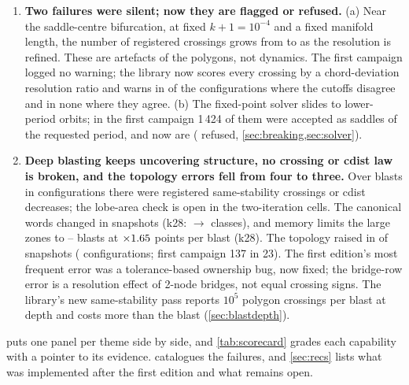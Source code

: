 \documentclass[11pt,a4paper]{article}
\begin{document}
\begin{enumerate}[leftmargin=*]
  \NumIsectMissedTotal{} missed and \NumIsectExtraTotal{} extra. Lobe areas
  are preserved to \NumLobeRatioMax{}, and \NumCdistDecreasingManifolds{}
  cdist decreases occur in \NumCdistStepsManifolds{} steps
  (\cref{sec:invariants,sec:intersections}).
\item \textbf{Two failures were silent; now they are flagged or refused.}
  (a) Near the saddle-centre bifurcation, at fixed $k+1=10^{-4}$ and a fixed
  manifold length, the number of registered crossings grows from
  \NumTangencyCrossingsNearCutoffSeven{} to
  \NumTangencyCrossingsNearCutoffTwelve{} as the resolution is refined. These
  are artefacts of the polygons, not dynamics. The first campaign logged no
  warning; the library now scores every crossing by a chord-deviation
  resolution ratio and warns in \NumTangencyFlaggedBelow{} of the
  configurations where the cutoffs disagree and in none where they agree.
  (b) The fixed-point solver slides to lower-period orbits; in the first
  campaign 1\,424 of them were accepted as saddles of the requested period,
  and now \NumSolverLowerAccepted{} are (\NumSolverLowerRejected{} refused,
  \cref{sec:breaking,sec:solver}).
\item \textbf{Deep blasting keeps uncovering structure, no crossing or cdist
  law is broken, and the topology errors fell from four to three.}
  Over \NumDeepBlasts{} blasts in \NumDeepConfigs{} configurations there were
  \NumDeepLawViolations{} registered same-stability crossings or cdist
  decreases; the lobe-area check is open in the two-iteration cells. The
  canonical words changed in \NumDeepStructureSteps{} snapshots (k28:
  \NumDeepClassesStartKTwoEight{} $\to$ \NumDeepClassesEndKTwoEight{}
  classes), and memory limits the large zones to
  \NumDeepBlastsKThreeTwo--\NumDeepBlastsKTwoEight{} blasts at
  $\times1.65$ points per blast (k28). The topology
  raised in \NumDeepErrorSnapshots{} of \NumDeepSnapshots{} snapshots
  (\NumDeepErrorConfigs{} configurations; first campaign 137 in 23). The
  first edition's most frequent error was a tolerance-based ownership bug,
  now fixed; the bridge-row error is a resolution effect of 2-node bridges,
  not equal crossing signs. The library's new same-stability pass reports
  $10^5$ polygon crossings per blast at depth and costs more than the blast
  (\cref{sec:blastdepth}).
\end{enumerate}

\noindent {} puts one panel per theme side by side, and
\cref{tab:scorecard} grades each capability with a pointer to its
evidence.  catalogues the failures, and \cref{sec:recs}
lists what was implemented after the first edition and what remains open.
\end{document}
